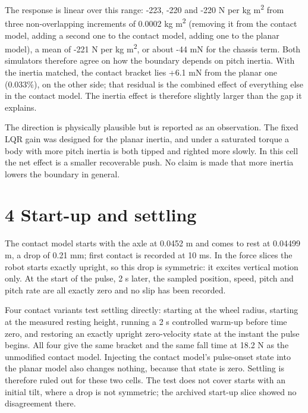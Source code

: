 \documentclass[11pt,a4paper]{article}
\begin{document}
The response is linear over this range: -223, -220 and -220 N per kg m\textsuperscript{2} from three non-overlapping increments of 0.0002 kg m\textsuperscript{2} (removing it from the contact model, adding a second one to the contact model, adding one to the planar model), a mean of -221 N per kg m\textsuperscript{2}, or about -44 mN for the chassis term. Both simulators therefore agree on how the boundary depends on pitch inertia. With the inertia matched, the contact bracket lies +6.1 mN from the planar one (0.033\%), on the other side; that residual is the combined effect of everything else in the contact model. The inertia effect is therefore slightly larger than the gap it explains.

The direction is physically plausible but is reported as an observation. The fixed LQR gain was designed for the planar inertia, and under a saturated torque a body with more pitch inertia is both tipped and righted more slowly. In this cell the net effect is a smaller recoverable push. No claim is made that more inertia lowers the boundary in general.

\clearpage
\section*{4 Start-up and settling}
The contact model starts with the axle at 0.0452 m and comes to rest at 0.04499 m, a drop of 0.21 mm; first contact is recorded at 10 ms. In the force slices the robot starts exactly upright, so this drop is symmetric: it excites vertical motion only. At the start of the pulse, 2 s later, the sampled position, speed, pitch and pitch rate are all exactly zero and no slip has been recorded.

Four contact variants test settling directly: starting at the wheel radius, starting at the measured resting height, running a 2 s controlled warm-up before time zero, and restoring an exactly upright zero-velocity state at the instant the pulse begins. All four give the same bracket and the same fall time at 18.2 N as the unmodified contact model. Injecting the contact model's pulse-onset state into the planar model also changes nothing, because that state is zero. Settling is therefore ruled out for these two cells. The test does not cover starts with an initial tilt, where a drop is not symmetric; the archived start-up slice showed no disagreement there.

\clearpage
\end{document}
